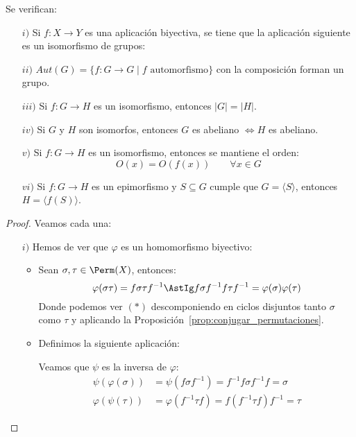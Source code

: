 \begin{prop}\label{prop:propiedades_grupos_isomorf}
    Se verifican:
    \begin{enumerate}
        \item[$i)$] Si $f:X\to Y$ es una aplicación biyectiva, se tiene que la aplicación siguiente es un isomorfismo de grupos:
        \item[$ii)$] $Aut(G) = \{f:G\to G \mid f \text{\ automorfismo}\}$ con la composición forman un grupo.
        \item[$iii)$] Si $f:G\to H$ es un isomorfismo, entonces $|G| = |H|$.
        \item[$iv)$] Si $G$ y $H$ son isomorfos, entonces $G$ es abeliano $\Longleftrightarrow H$ es abeliano.
        \item[$v)$] Si $f:G\to H$ es un isomorfismo, entonces se mantiene el orden:
            \begin{equation*}
                O(x) = O(f(x)) \qquad \forall x\in G
            \end{equation*}
        \item[$vi)$] Si $f:G\to H$ es un epimorfismo y $S\subseteq G$ cumple que $G= \langle S \rangle $, entonces $H=\langle f(S) \rangle $.
    \end{enumerate}
    \begin{proof}
        Veamos cada una:
        \begin{enumerate}
            \item[$i)$] Hemos de ver que $\varphi$ es un homomorfismo biyectivo:
                \begin{itemize}
                    \item Sean $\sigma,\tau \in \Perm(X)$, entonces:
                        \begin{equation*}
                            \varphi(\sigma\tau) = f\sigma\tau f^{-1} \AstIg f\sigma f^{-1}f\tau f^{-1} = \varphi(\sigma)\varphi(\tau)
                        \end{equation*}
                        Donde podemos ver $(\ast)$ descomponiendo en ciclos disjuntos tanto $\sigma$ como $\tau$ y aplicando la Proposición~\ref{prop:conjugar_permutaciones}.
                    \item Definimos la siguiente aplicación:

                        Veamos que $\psi$ es la inversa de $\varphi$:
                        \begin{align*}
                            \psi(\varphi(\sigma)) &= \psi(f\sigma f^{-1}) = f^{-1}f\sigma f^{-1}f = \sigma \\
                            \varphi(\psi(\tau)) &= \varphi(f^{-1}\tau f) = f(f^{-1}\tau f)f^{-1} = \tau
                        \end{align*}


\end{itemize}
\end{enumerate}
\end{proof}
\end{prop}
